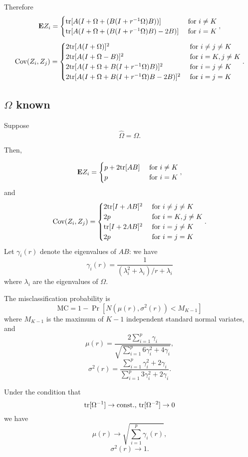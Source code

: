 \documentclass[12pt]{article}
\begin{document}
Therefore
\[
\textbf{E} Z_i = \begin{cases}
\text{tr}[A (I + \Omega + (B(I + r^{-1}\Omega) B))] & \text{ for }i \neq K\\
\text{tr}[A (I + \Omega + (B(I + r^{-1}\Omega) B) - 2B)] & \text{ for }i = K
\end{cases},
\]
\[
\text{Cov}(Z_i, Z_j) = 
\begin{cases}
2\text{tr}[A (I + \Omega)]^2 & \text{ for }i \neq j \neq K\\
2\text{tr}[A (I + \Omega - B)]^2 & \text{ for }i =K, j \neq K\\
2\text{tr}[A (I + \Omega + B(I + r^{-1}\Omega) B)]^2 & \text{ for }i=j \neq K\\
2\text{tr}[A (I + \Omega + B(I + r^{-1}\Omega) B - 2B)]^2 & \text{ for }i=j=K
\end{cases}.
\]

\subsection{$\Omega$ known}

Suppose
\[
\hat{\Omega} = \Omega.
\]

Then,

\[
\textbf{E} Z_i = \begin{cases}
p + 2\text{tr}[AB] & \text{ for }i \neq K\\
p & \text{ for }i = K
\end{cases},
\]
and
\[
\text{Cov}(Z_i, Z_j) = 
\begin{cases}
2\text{tr}[I + AB]^2 & \text{ for }i \neq j \neq K\\
2p & \text{ for }i =K, j \neq K\\
\text{tr}[I + 2AB]^2 & \text{ for }i=j \neq K\\
2p & \text{ for }i=j=K
\end{cases}.
\]
Let $\gamma_i(r)$ denote the eigenvalues of $AB$: we have
\[
\gamma_i(r) = \frac{1}{(\lambda_i^2 + \lambda_i)/r + \lambda_i}
\]
where $\lambda_i$ are the eigenvalues of $\Omega$.

The misclassification probability is
\[
\text{MC} = 1 - \Pr[N(\mu(r), \sigma^2(r)) < M_{K-1}]
\]
where $M_{K-1}$ is the maximum of $K-1$ independent standard normal variates,
and
\[
\mu(r) = \frac{2\sum_{i=1}^p \gamma_i}{\sqrt{\sum_{i=1}^p 6\gamma_i^2 + 4 \gamma_i}},
\]
\[
\sigma^2(r) = \frac{\sum_{i=1}^p \gamma_i ^2 + 2\gamma_i}{\sum_{i=1}^p 3\gamma_i^2 + 2\gamma_i}.
\]

Under the condition that
\[
\text{tr}[\Omega^{-1}] \to \text{const., }\text{tr}[\Omega^{-2}] \to 0
\]
we have
\[
\mu(r) \to \sqrt{\sum_{i=1}^p \gamma_i(r)},
\]
\[
\sigma^2(r) \to 1.
\]
\end{document}
